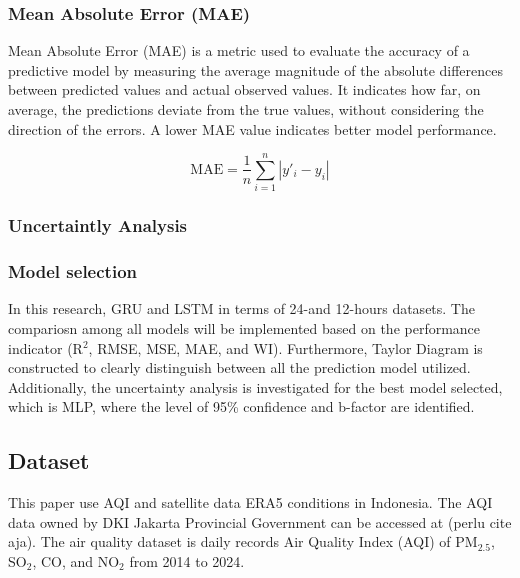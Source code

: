 \documentclass[pdflatex,sn-mathphys-num]{sn-jnl}%
\theoremstyle{thmstyleone}%
\theoremstyle{thmstyletwo}%
\theoremstyle{thmstylethree}%
\begin{document}
\subsubsection{Mean Absolute Error (MAE)}
Mean Absolute Error (MAE) is a metric used to evaluate the accuracy of a predictive model by measuring the average magnitude of the absolute differences between predicted values and actual observed values. It indicates how far, on average, the predictions deviate from the true values, without considering the direction of the errors. A lower MAE value indicates better model performance.


\begin{equation}
\mathrm{MAE} = \frac{1}{n} \sum_{i=1}^{n} \left| y'_i - y_i \right|
\tag{14}
\end{equation}

\subsubsection{Uncertaintly Analysis}

\subsubsection{Model selection}
In this research, GRU and LSTM in terms of 24-and 12-hours datasets. The compariosn among all models will be implemented based on the performance indicator (R$^{2}$, RMSE, MSE, MAE, and WI). Furthermore, Taylor Diagram is constructed to clearly distinguish between all the prediction model utilized. Additionally, the uncertainty analysis is investigated for the best model selected, which is MLP, where the level of 95\% confidence and b-factor are identified.

\subsection{Dataset}
This paper use AQI and satellite data ERA5 conditions in Indonesia. The AQI data owned by DKI Jakarta Provincial Government can be accessed at (perlu cite aja). The air quality dataset is daily records Air Quality Index (AQI) of  PM$_{2.5}$, SO$_{2}$, CO, and NO$_{2}$ from 2014 to 2024.
\end{document}
